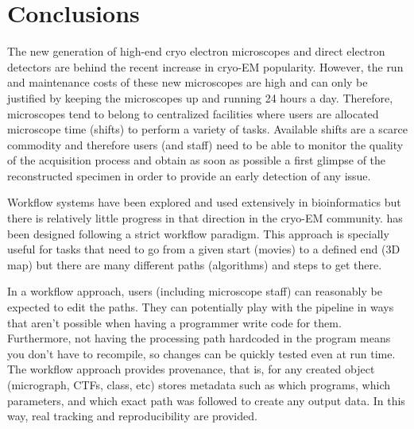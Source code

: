 
\section{Conclusions}

The new generation of high-end cryo electron microscopes and direct electron detectors are behind the recent increase in cryo-EM  popularity. However, the run and maintenance costs of these new microscopes are high and can only be justified by keeping the microscopes up and running 24 hours a day. Therefore, microscopes tend to belong to centralized facilities where users are allocated microscope time (shifts) to perform a variety of tasks. Available shifts are a scarce commodity and therefore users (and staff) need to be able to monitor the quality of the acquisition process and obtain as soon as possible a first glimpse of the reconstructed specimen in order to provide an early detection of any issue. 

 Workflow systems have been explored and used extensively in bioinformatics but there is relatively little progress in that direction in the cryo-EM community. \scipion has been designed following a strict workflow paradigm. This approach is specially useful for tasks that need to go from a given start (movies) to a defined end (3D map) but there are many different paths (algorithms) and steps to get there.
 
 In a workflow approach, users (including microscope staff) can reasonably be expected to edit the paths. They can potentially play with the pipeline in ways that aren't possible when having a programmer write code for them. Furthermore, not having the processing path hardcoded in the program means you don't have to recompile, so changes can be quickly tested   even at run time. The \scipion workflow approach provides provenance, that is,  for any created object (micrograph, CTFs, class, etc) \scipion stores metadata such as which programs, which parameters, and which exact path was followed to create any output data.  In this way,  real tracking and reproducibility are provided. 

